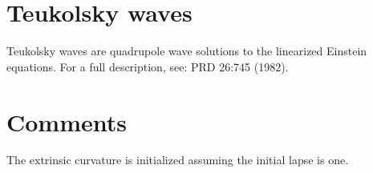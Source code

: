 \documentclass{article}
\begin{document}
\section{Teukolsky waves}
Teukolsky waves are quadrupole wave solutions to the linearized
Einstein equations.  For a full description, see: PRD 26:745 (1982).


\section{Comments}
The extrinsic curvature is initialized assuming the initial lapse is one.

\end{document}
